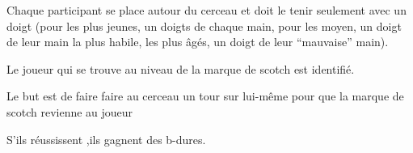 \documentclass{grand-jeu}
\begin{document}
\begin{liste-materiel}
\end{liste-materiel}

\begin{regles} Chaque participant se place autour du cerceau et doit le tenir seulement avec un doigt (pour les plus jeunes, un doigts de chaque main, pour les moyen, un doigt de leur main la plus habile, les plus âgés, un doigt de leur “mauvaise” main). 

Le joueur qui se trouve au niveau de la marque de scotch est identifié. 

Le but est de faire faire au cerceau un tour sur lui-même pour que la marque de scotch revienne au joueur

S'ils réussissent ,ils gagnent des b-dures.
\end{regles}

\begin{moments-stop}
\end{moments-stop}
\end{document}
